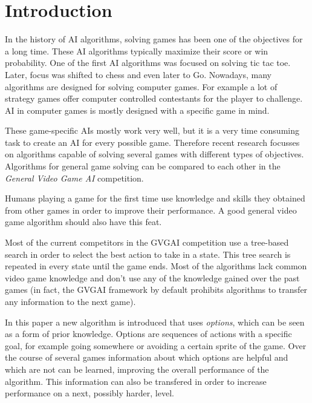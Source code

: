 \section{Introduction}
\label{sec:introduction}
In the history of AI algorithms, solving games has been one of the objectives
for a long time. These AI algorithms typically maximize their score or win
probability. One of the first AI algorithms was focused on solving tic tac
toe. Later, focus was shifted to chess and even later to Go. Nowadays, many
algorithms are designed for solving computer games. For example a lot of
strategy games offer computer controlled contestants for the player to
challenge. AI in computer games is mostly designed with a specific game in mind.

These game-specific AIs mostly work very well, but it is a very time consuming
task to create an AI for every possible game. Therefore recent research focusses
on algorithms capable of solving several games with different types of
objectives. Algorithms for general game solving can be compared to each other in
the \emph{General Video Game AI} competition\cite{perez2014}. 

Humans playing a game for the first time use knowledge and skills they
obtained from other games in order to improve their performance. A good
general video game algorithm should also have this feat. 

Most of the current competitors in the GVGAI competition use a tree-based search
in order to select the best action to take in a state. This tree search is 
repeated in every state until the game ends. Most of the algorithms lack
common video game knowledge and don't use any of the knowledge gained over the
past games (in fact, the GVGAI framework by default prohibits algorithms to
transfer any information to the next game).

In this paper a new algorithm is introduced that uses \emph{options}, which can be seen
as a form of prior knowledge. Options are sequences of actions with a specific
goal, for example going somewhere or avoiding a certain sprite of the game.
Over the course of several games information about which options are helpful and
which are not can be learned, improving the overall performance of the
algorithm. This information can also be transfered in order to increase
performance on a next, possibly harder, level.
